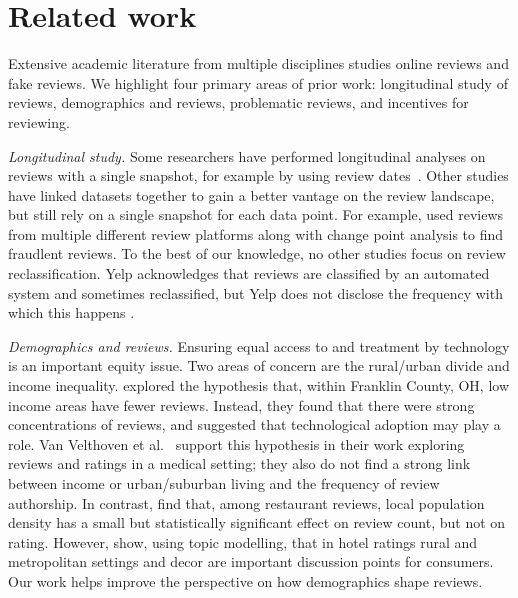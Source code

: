 \section{Related work} \label{sec:related_work}

Extensive academic literature from multiple disciplines studies online reviews and fake reviews. We highlight four primary areas of prior work: longitudinal study of reviews, demographics and reviews, problematic reviews, and incentives for reviewing.

\textit{Longitudinal study.} Some researchers have performed longitudinal analyses on reviews with a single snapshot, for example by using review dates~\cite{bakhshi2014demographics,ye2016temporal,wang2017temporal}.  Other studies have linked datasets together to gain a better vantage on the review landscape, but still rely on a single snapshot for each data point. For example, \citet{nilizadeh2019think} used reviews from multiple different review platforms along with change point analysis to find fraudlent reviews. To the best of our knowledge, no other studies focus on review reclassification. Yelp acknowledges that reviews are classified by an automated system and sometimes reclassified, but Yelp does not disclose the frequency with which this happens \cite{yelpwhyrec,yelpwhychange}.

\textit{Demographics and reviews.} Ensuring equal access to and treatment by technology is an important equity issue. Two areas of concern are the rural/urban divide and income inequality. \citet{baginski2014exploring} explored the hypothesis that, within Franklin County, OH, low income areas have fewer reviews. Instead, they found that there were strong concentrations of reviews, and suggested that technological adoption may play a role. Van Velthoven et al.~\cite{van2018cross} support this hypothesis in their work exploring reviews and ratings in a medical setting; they also do not find a strong link between income or urban/suburban living and the frequency of review authorship. In contrast, \citet{bakhshi2014demographics} find that, among restaurant reviews, local population density has a small but statistically significant effect on review count, but not on rating.  However, \citet{sutherland2020topic} show, using topic modelling, that in hotel ratings rural and metropolitan settings and decor are important discussion points for consumers. Our work helps improve the perspective on how demographics shape reviews.

